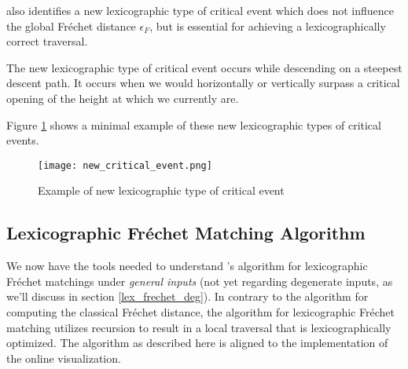 \citeauthor{rotelex} also identifies a new lexicographic type of critical event which does not influence the global Fréchet distance $\epsilon_F$, but is essential for achieving a lexicographically correct traversal.

The new lexicographic type of critical event occurs while descending on a steepest descent path. It occurs when we would horizontally or vertically surpass a critical opening of the height at which we currently are.

Figure \ref{fig:new_critical_event} shows a minimal example of these new lexicographic types of critical events.

\begin{figure}[H]
    \centering
    
	\texttt{[image: new\_critical\_event.png]}
	
	\caption{Example of new lexicographic type of critical event\protect\footnotemark}
    \label{fig:new_critical_event}
\end{figure}


\subsection{Lexicographic Fréchet Matching Algorithm}\label{sec:lex_frechet_alg}

We now have the tools needed to understand \citeauthor{rotelex}'s algorithm for lexicographic Fréchet matchings\cite{rotelex} under \textit{general inputs} (not yet regarding degenerate inputs, as we'll discuss in section \ref{lex_frechet_deg}). In contrary to the algorithm for computing the classical Fréchet distance, the algorithm for lexicographic Fréchet matching utilizes recursion to result in a local traversal that is lexicographically optimized. The algorithm as described here is aligned to the implementation of the online visualization.

